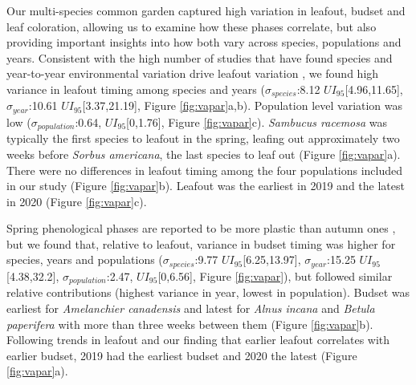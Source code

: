 \documentclass{article}[12pt]
\begin{document}
Our multi-species common garden captured high variation in leafout, budset and leaf coloration, allowing us to examine how these phases correlate, but also providing important insights into how both vary across species, populations and years. Consistent with the high number of studies that have found species and year-to-year environmental variation drive leafout variation \citep{delpierre2024, donnelly2017, polgar2011}, we found high variance in leafout timing among species and years ($\sigma_{species}$:8.12 $UI_{95}$[4.96,11.65], $\sigma_{year}$:10.61 $UI_{95}$[3.37,21.19], Figure \ref{fig:vapar}a,b). Population level variation was low ($\sigma_{population}$:0.64, $UI_{95}$[0,1.76], Figure \ref{fig:vapar}c). \emph{Sambucus racemosa} was typically the first species to leafout in the spring, leafing out approximately two weeks before \emph{Sorbus americana}, the last species to leaf out (Figure \ref{fig:vapar}a). There were no differences in leafout timing among the four populations included in our study (Figure \ref{fig:vapar}b). Leafout was the earliest in 2019 and the latest in 2020 (Figure \ref{fig:vapar}c). 


Spring phenological phases are reported to be more plastic than autumn ones \citep{mckown2014, aitken2016, vico2021}, but we found that, relative to leafout, variance in budset %
timing was higher for species, years and populations ($\sigma_{species}$:9.77 $UI_{95}$[6.25,13.97], $\sigma_{year}$:15.25 $UI_{95}$[4.38,32.2], $\sigma_{population}$:2.47, $UI_{95}$[0,6.56], Figure \ref{fig:vapar}), but followed similar relative contributions (highest variance in year, lowest in population). Budset was earliest for \emph{Amelanchier canadensis} and latest for \emph{Alnus incana} and \emph{Betula paperifera} with more than three weeks between them (Figure \ref{fig:vapar}b). %
Following trends in leafout and our finding that earlier leafout correlates with earlier budset, 2019 had the earliest budset and 2020 the latest (Figure \ref{fig:vapar}a).
\end{document}
